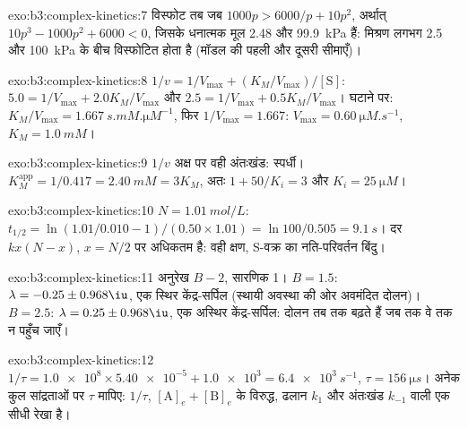\begin{solution}{exo:b3:complex-kinetics:7}
विस्फोट तब जब $1000p > 6000/p + 10p^2$, अर्थात् $10p^3 - 1000p^2 + 6000 < 0$, जिसके धनात्मक
मूल 2.48 और \qty{99.9}{kPa} हैं: मिश्रण लगभग 2.5 और
\qty{100}{kPa} के बीच विस्फोटित होता है (मॉडल की पहली और दूसरी सीमाएँ)।
\end{solution}

\begin{solution}{exo:b3:complex-kinetics:8}
$1/v = 1/V_{\max} + (K_M/V_{\max})/[\mathrm S]$: $5.0 = 1/V_{\max} + 2.0K_M/V_{\max}$ और $2.5 = 1/V_{\max} + 0.5K_M/V_{\max}$।
घटाने पर: $K_M/V_{\max} = \qty{1.667}{s.mM.\micro M^{-1}}$, फिर $1/V_{\max} = 1.667$: $V_{\max} = \qty{0.60}{\micro M.s^{-1}}$,
$K_M = \qty{1.0}{mM}$।
\end{solution}

\begin{solution}{exo:b3:complex-kinetics:9}
$1/v$ अक्ष पर वही अंतःखंड: स्पर्धी। $K_M^{\mathrm{app}} = 1/0.417 = \qty{2.40}{mM} = 3K_M$, अतः
$1 + 50/K_i = 3$ और $K_i = \qty{25}{\micro M}$।
\end{solution}

\begin{solution}{exo:b3:complex-kinetics:10}
$N = \qty{1.01}{mol/L}$: $t_{1/2} = \ln(1.01/0.010 - 1)/(0.50 \times 1.01) = \ln100/0.505 = \qty{9.1}{s}$।
दर $kx(N - x)$, $x = N/2$ पर अधिकतम है: वही क्षण, S-वक्र का
नति-परिवर्तन बिंदु।
\end{solution}

\begin{solution}{exo:b3:complex-kinetics:11}
अनुरेख $B - 2$, सारणिक 1। $B = 1.5$: $\lambda = -0.25 \pm 0.968\iu$, एक स्थिर केंद्र-सर्पिल (स्थायी
अवस्था की ओर अवमंदित दोलन)। $B = 2.5$: $\lambda = 0.25 \pm 0.968\iu$, एक अस्थिर केंद्र-सर्पिल:
दोलन तब तक बढ़ते हैं जब तक वे  तक न पहुँच जाएँ।
\end{solution}

\begin{solution}{exo:b3:complex-kinetics:12}
$1/\tau = \num{1.0e8} \times \num{5.40e-5} + \num{1.0e3} = \qty{6.4e3}{s^{-1}}$, $\tau = \qty{156}{\micro s}$। अनेक
कुल सांद्रताओं पर $\tau$ मापिए: $1/\tau$, $[\mathrm A]_e + [\mathrm B]_e$ के विरुद्ध, ढलान $k_1$ और
अंतःखंड $k_{-1}$ वाली एक सीधी रेखा है।
\end{solution}

